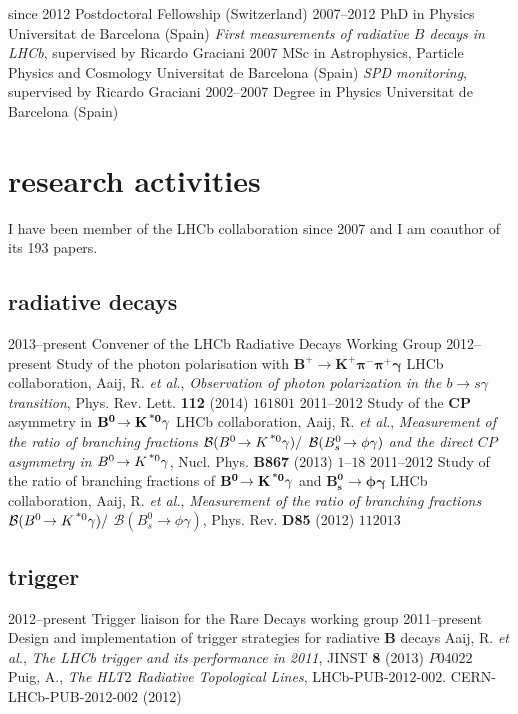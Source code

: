   \cventry
    {since 2012}
    {Postdoctoral Fellowship}
    {\epfl(Switzerland)}
    {}
  \cventry
    {2007--2012}
    {PhD in Physics}
    {Universitat de Barcelona (Spain)}
    {\emph{First measurements of radiative $B$ decays in LHCb}, supervised by Ricardo Graciani}
  \cventry
    {2007}
    {MSc in Astrophysics, Particle Physics and Cosmology}
    {Universitat de Barcelona (Spain)}
    {\emph{SPD monitoring}, supervised by Ricardo Graciani}
  \cventry
    {2002--2007}
    {Degree in Physics}
    {Universitat de Barcelona (Spain)}
    {}

\section{research activities}
I have been member of the LHCb collaboration since 2007 and I am coauthor of its 193 papers.


\subsection{radiative decays}
    \cventry
    {2013--present}
    {Convener of the LHCb Radiative Decays Working Group}
    {}
    {}
    \cventry
    {2012--present}
    {Study of the photon polarisation with $\mathbf{B^+\!\to K^+\pi^-\pi^+\gamma}$}
    {}
    {LHCb collaboration, Aaij, R. \textit{et al.}, \textit{Observation of photon polarization in the $b \to s\gamma$ transition}, Phys. Rev. Lett. \textbf{112} (2014) $161801$}
    \cventry
    {2011--2012}
    {Study of the $\mathbf{CP}$ asymmetry in $\mathbf{B^0\!\to K^{\text{\,*}0}\gamma}$}
    {}
    {LHCb collaboration, Aaij, R. \textit{et al.}, \textit{Measurement of the ratio of branching fractions ${\cal B}(B^0\!\to K^{\text{\,*}0} \gamma) /$ ${\cal B}(B^0_s\!\to \phi \gamma)$ and the direct $CP$ asymmetry in $B^0\!\to K^{\text{\,*}0} \gamma$}, Nucl. Phys. \textbf{B867} (2013) $1$--$18$}
    \cventry
    {2011--2012}
    {Study of the ratio of branching fractions of $\mathbf{B^0\!\to K^{\text{\,*}0}\gamma}$ and $\mathbf{B^0_s\!\to \phi\gamma}$}
    {}
    {LHCb collaboration, Aaij, R. \textit{et al.}, \textit{Measurement of the ratio of branching fractions $\mathcal{B}(B^0\!\to K^{\text{\,*}0}\gamma)/$ $\mathcal{B}(B_s^0\to\phi\gamma)$}, Phys. Rev. \textbf{D85} (2012) $112013$}

\subsection{trigger}
    \cventry
    {2012--present}
    {Trigger liaison for the Rare Decays working group}
    {}
    {}
    \cventry
    {2011--present}
    {Design and implementation of trigger strategies for radiative $\mathbf{B}$ decays}
    {}
    {Aaij, R. \textit{et al.}, \textit{The LHCb trigger and its performance in 2011}, JINST \textbf{8} (2013) $P04022$\\
     Puig, A., \textit{The HLT$2$ Radiative Topological Lines}, LHCb-PUB-$2012$-$002$. CERN-LHCb-PUB-$2012$-$002$ (2012)}

